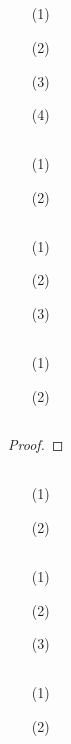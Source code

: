 \documentclass[UTF8]{ctexart}
\begin{document}
\subsection{}   %
\begin{enumerate}
    \item [(1)]
    \item [(2)]
    \item [(3)]
    \item [(4)]
\end{enumerate}

\subsection{}   %
\begin{enumerate}
    \item [(1)]
    \item [(2)]
\end{enumerate}

\subsection{}   %
\begin{enumerate}
    \item [(1)]
    \item [(2)]
    \item [(3)]
\end{enumerate}

\subsection{}   %
\begin{enumerate}
    \item [(1)]
    \item [(2)]
\end{enumerate}

\subsection{}   %
\begin{proof}
    
\end{proof}

\subsection{}   %
\begin{enumerate}
    \item [(1)]
    \item [(2)]
\end{enumerate}

\subsection{}   %
\begin{enumerate}
    \item [(1)]
    \item [(2)]
    \item [(3)]
\end{enumerate}

\subsection{}   %
\begin{enumerate}
    \item [(1)]
    \item [(2)]
\end{enumerate}
\end{document}

